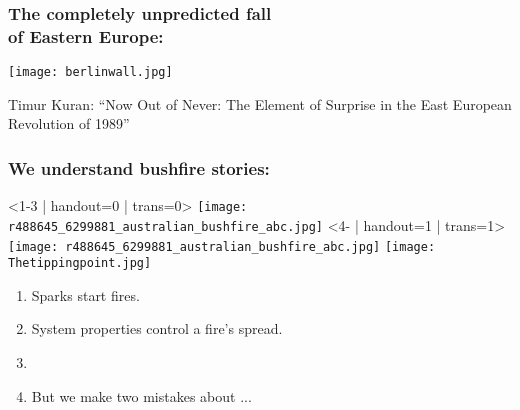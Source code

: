 \begin{frame}
  \frametitle{The completely unpredicted fall\\ of Eastern Europe:}

  \texttt{[image: berlinwall.jpg]}

  {
    \small
    Timur Kuran:\cite{kuran1991a} 
    ``Now Out of Never: The Element of Surprise in the East European Revolution of 1989''
  }

\end{frame}



\begin{frame}
  \frametitle{We understand bushfire stories:}

  \begin{overprint}
    \onslide<1-3 | handout=0 | trans=0>
    \texttt{[image: r488645\_6299881\_australian\_bushfire\_abc.jpg]}
    \onslide<4- |  handout=1 | trans=1>
    \texttt{[image: r488645\_6299881\_australian\_bushfire\_abc.jpg]}
    \texttt{[image: Thetippingpoint.jpg]}
  \end{overprint}

  \begin{enumerate}
  \item<1-> 
    Sparks start fires.
  \item<2->
    System properties control a fire's spread.
   \item<3->[]
   \item<3-> 
     But we make two mistakes about ...
   \end{enumerate}



\end{frame}
